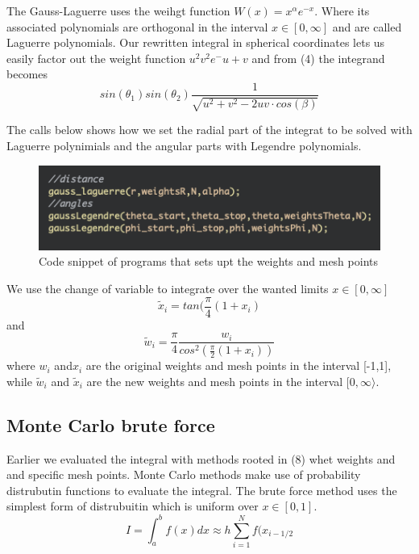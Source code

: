 \documentclass[twoside,twocolumn]{article}
\begin{document}
The Gauss-Laguerre uses the weihgt function $W(x)  = x^\alpha e^{-x}$. Where its associated polynomials are orthogonal in the interval $x\in[0,\infty]$ and are called Laguerre polynomials. Our rewritten integral in spherical coordinates lets us easily factor out the weight function $u^2v^2 e^-{u+v}$ and from (4) the integrand becomes
\begin{equation}
sin(\theta_1)sin(\theta_2)\frac{1}{\sqrt{u^2+v^2-2uv \cdot cos(\beta)}}
\end{equation}

The calls below shows how we set the radial part of the integrat to be solved with Laguerre polynimials and the angular parts with Legendre polynomials.
\begin{figure}[h]
\center
\includegraphics[scale=0.55]{Laguerre.png}
\caption{Code snippet of programs that sets upt the weights and mesh points}
\end{figure}

We use the change of variable to integrate over the wanted limits $x\in[0,\infty]$
\begin{equation}
	\tilde{x}_i = tan(\frac{\pi}{4}(1+x_i)
\end{equation}
and
\begin{equation}
	\tilde{w}_i = \frac{\pi}{4}\frac{w_i}{cos^2({\frac{\pi}{2}(1+x_i)})}
\end{equation}
where $w_i$ and$x_i$ are the original weights and mesh points in the interval [-1,1], while $\tilde{w}_i$ and $\tilde{x}_i$ are the new weights and mesh points in the interval $[0,\infty\rangle$.

\subsection{Monte Carlo brute force}
Earlier we evaluated the integral with methods rooted in (8) whet weights and and specific mesh points. Monte Carlo methods make use of probability distrubutin functions to evaluate the integral. The brute force method uses the simplest form of distrubuitin which is uniform over $x\in[0,1]$.
\begin{equation}
I =\int_{a}^{b}f(x)dx \approx h\sum_{i=1}^{N} f(x_{i-1/2}
\end{equation}
\end{document}
